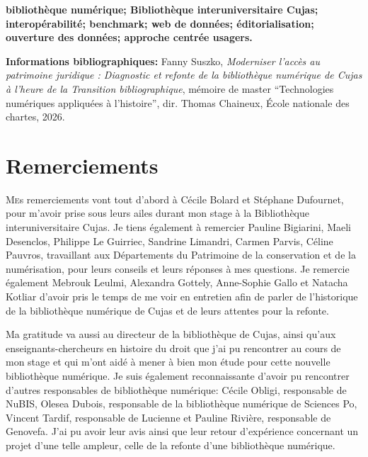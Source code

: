 \documentclass[12pt,twoside]{book}
\begin{document}
	\textbf{bibliothèque numérique; Bibliothèque interuniversitaire Cujas; interopérabilité; benchmark; web de données; éditorialisation; ouverture des données; approche centrée usagers.} 
	
	\textbf{Informations bibliographiques:} Fanny Suszko, \textit{ Moderniser l'accès au patrimoine juridique : Diagnostic et refonte de la bibliothèque numérique de Cujas à l'heure de la Transition bibliographique}, mémoire de master \enquote{Technologies numériques appliquées à l'histoire}, dir. Thomas Chaineux, École nationale des chartes, 2026.
	
		\newpage{\pagestyle{empty}\cleardoublepage}
		
	
	\chapter{Remerciements}
	
\lettrine{M}es remerciements vont tout d'abord à Cécile Bolard et Stéphane Dufournet, pour m'avoir prise sous leurs ailes durant mon stage à la Bibliothèque interuniversitaire Cujas. Je tiens également à remercier Pauline Bigiarini, Maeli Desenclos, Philippe Le Guirriec, Sandrine Limandri, Carmen Parvis, Céline Pauvros, travaillant aux Départements du Patrimoine de la conservation et de la numérisation, pour leurs conseils et leurs réponses à mes questions. Je remercie également Mebrouk Leulmi, Alexandra Gottely, Anne-Sophie Gallo et Natacha Kotliar d'avoir pris le temps de me voir en entretien afin de parler de l'historique de la bibliothèque numérique de Cujas et de leurs attentes pour la refonte. 

Ma gratitude va aussi au directeur de la bibliothèque de Cujas, ainsi qu'aux enseignants-chercheurs en histoire du droit que j'ai pu rencontrer au cours de mon stage et qui m'ont aidé à mener à bien mon étude pour cette nouvelle bibliothèque numérique. Je suis également reconnaissante d'avoir pu rencontrer d'autres responsables de bibliothèque numérique: Cécile Obligi, responsable de NuBIS, Olesea Dubois, responsable de la bibliothèque numérique de Sciences Po, Vincent Tardif, responsable de Lucienne et Pauline Rivière, responsable de Genovefa. J'ai pu avoir leur avis ainsi que leur retour d'expérience concernant un projet d'une telle ampleur, celle de la refonte d'une bibliothèque numérique.
\end{document}
